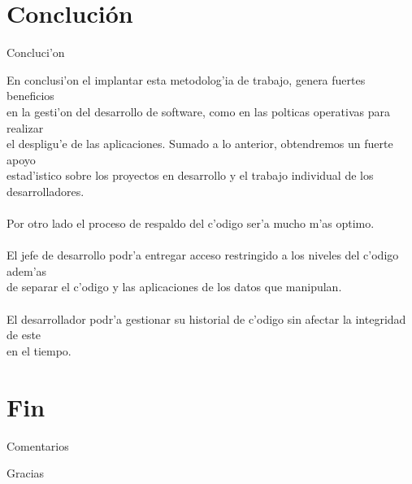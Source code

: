 \documentclass[xcolor=dvipsnames]{beamer}
\begin{document}
\section{Concluci\'on}	
	\begin{frame}{Concluci'on}
	\scriptsize
	{
	\begin{tabbing}
	En conclusi'on el implantar esta metodolog'{i}a de trabajo, genera fuertes beneficios \\
	en la gesti'on del desarrollo de software, como en las polticas operativas para realizar \\
	el despligu'e de las  aplicaciones. Sumado a lo anterior, obtendremos un fuerte apoyo \\
	estad'{i}stico sobre los proyectos en desarrollo y el trabajo individual de los desarrolladores. \\
	\\
	Por otro lado el proceso de respaldo del c'odigo ser'a mucho m'as optimo. \\
	\\
	El jefe de desarrollo podr'a entregar acceso restringido a los niveles del c'odigo adem'as \\
	de separar el c'odigo y las aplicaciones de los datos que manipulan.\\
	\\
	El desarrollador podr'a gestionar su historial de c'odigo sin afectar la integridad de este \\
	en el tiempo. 

	\end{tabbing}
	}
	\end{frame}
\section{Fin}	
	\begin{frame}{\begin{center} Comentarios \end{center}}

	\end{frame}
	
	\begin{frame}{\begin{center} Gracias \end{center}}

	\end{frame}
\end{document}
